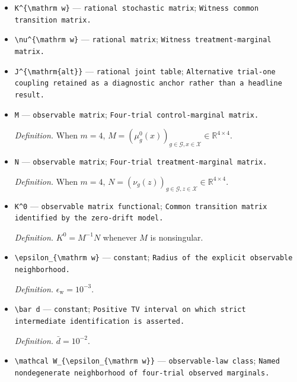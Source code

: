 \documentclass{article}
\begin{document}
\begin{itemize}
  \item \texttt{K\textasciicircum{}\{\textbackslash{}\allowbreak{}mathrm w\}\allowbreak{}} --- \texttt{rational stochastic matrix}; \texttt{Witness common transition matrix.}
  \item \texttt{\textbackslash{}\allowbreak{}nu\textasciicircum{}\{\textbackslash{}\allowbreak{}mathrm w\}\allowbreak{}} --- \texttt{rational matrix}; \texttt{Witness treatment-\allowbreak{}marginal matrix.}
  \item \texttt{J\textasciicircum{}\{\textbackslash{}\allowbreak{}mathrm\{alt\}\allowbreak{}\}\allowbreak{}} --- \texttt{rational joint table}; \texttt{Alternative trial-\allowbreak{}one coupling retained as a diagnostic anchor rather than a headline result.}
  \item \texttt{M} --- \texttt{observable matrix}; \texttt{Four-\allowbreak{}trial control-\allowbreak{}marginal matrix.}
  \par\smallskip\noindent\emph{Definition.} When \(m=4\), \(M=(\mu_g^0(x))_{g\in\mathcal G,x\in\mathcal X}\in\mathbb R^{4\times4}\).
  \item \texttt{N} --- \texttt{observable matrix}; \texttt{Four-\allowbreak{}trial treatment-\allowbreak{}marginal matrix.}
  \par\smallskip\noindent\emph{Definition.} When \(m=4\), \(N=(\nu_g(z))_{g\in\mathcal G,z\in\mathcal X}\in\mathbb R^{4\times4}\).
  \item \texttt{K\textasciicircum{}0} --- \texttt{observable matrix functional}; \texttt{Common transition matrix identified by the zero-\allowbreak{}drift model.}
  \par\smallskip\noindent\emph{Definition.} \(K^0=M^{-1}N\) whenever \(M\) is nonsingular.
  \item \texttt{\textbackslash{}\allowbreak{}epsilon\_\allowbreak{}\{\textbackslash{}\allowbreak{}mathrm w\}\allowbreak{}} --- \texttt{constant}; \texttt{Radius of the explicit observable neighborhood.}
  \par\smallskip\noindent\emph{Definition.} \(\epsilon_{\mathrm w}=10^{-3}\).
  \item \texttt{\textbackslash{}\allowbreak{}bar d} --- \texttt{constant}; \texttt{Positive TV interval on which strict intermediate identification is asserted.}
  \par\smallskip\noindent\emph{Definition.} \(\bar d=10^{-2}\).
  \item \texttt{\textbackslash{}\allowbreak{}mathcal W\_\allowbreak{}\{\textbackslash{}\allowbreak{}epsilon\_\allowbreak{}\{\textbackslash{}\allowbreak{}mathrm w\}\allowbreak{}\}\allowbreak{}} --- \texttt{observable-\allowbreak{}law class}; \texttt{Named nondegenerate neighborhood of four-\allowbreak{}trial observed marginals.}

\end{itemize}
\end{document}
